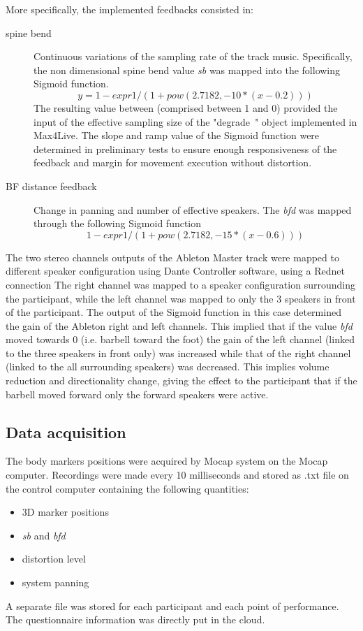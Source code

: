 \documentclass[10pt,letterpaper]{article}
\begin{document}
More specifically, the implemented feedbacks consisted in:
\begin{description}
\item[spine bend] Continuous variations of the sampling rate of the track music. Specifically, the non dimensional spine bend value \emph{sb} was mapped into the following Sigmoid function.
$$ y = 1 - expr 1/(1+pow(2.7182,-10*(x-0.2)))$$ The resulting value between (comprised between 1 and 0) provided the input of the effective sampling size of the "degrade~" object implemented in Max4Live. The slope and ramp value of the Sigmoid function were determined in preliminary tests to ensure enough responsiveness of the feedback and margin for movement execution without distortion.  

\item[BF distance feedback] Change in panning and number of effective speakers. The \emph{bfd} was mapped through the following Sigmoid function $$1 - expr 1/(1+pow(2.7182,-15*(x-0.6)))$$
\end{description} 
The two stereo channels outputs of the Ableton Master track were mapped to different speaker configuration using Dante Controller software, using a Rednet connection
The right channel was mapped to a speaker configuration surrounding the participant, while the left channel was mapped to only the 3 speakers in front of the participant.
The output of the Sigmoid function in this case determined the gain of the Ableton right and left channels. This implied that if the  value \emph{bfd} moved towards 0 (i.e. barbell toward the foot) the gain of the left channel (linked to the three speakers in front only) was increased while that of the right channel (linked to the all surrounding speakers) was decreased. This implies volume reduction and directionality change, giving the effect to the participant that if the barbell moved forward only the forward speakers were active.


\subsection*{Data acquisition}

The body markers positions were acquired by Mocap system on the Mocap computer. 
Recordings were made every 10 milliseconds and stored as .txt file on the control computer containing the following quantities:
\begin{itemize}
\item 3D marker positions
\item \emph{sb} and \emph{bfd}  
\item distortion level
\item system panning 
\end{itemize}
A separate file was stored for each participant and each point of performance.
The questionnaire information was directly put in the cloud.
\end{document}
